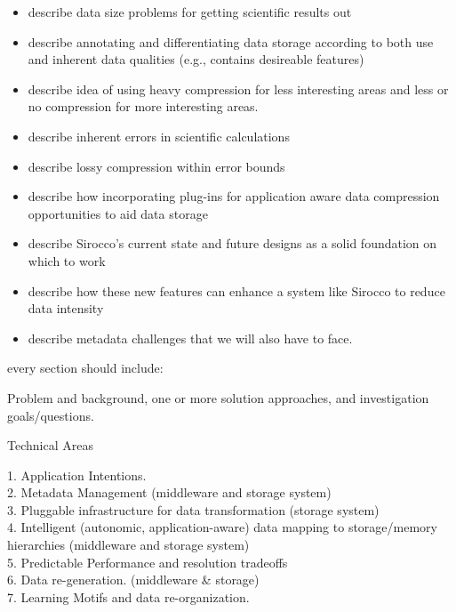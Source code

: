 {\begin{itemize}

\item describe data size problems for getting scientific results out
\item describe annotating and differentiating data storage according to both
  use and inherent data qualities (e.g., contains desireable features)
\item describe idea of using heavy compression for less interesting areas
  and less or no compression for more interesting areas.
\item describe inherent errors in scientific calculations
\item describe lossy compression within error bounds
\item describe how incorporating plug-ins for application aware data
  compression opportunities to aid data storage
\item describe Sirocco's current state and future designs as a solid
  foundation on which to work
\item describe how these new features can enhance a system like Sirocco to
  reduce data intensity
\item describe metadata challenges that we will also have to face.

\end{itemize}

every section should include:

Problem and background, one or more solution approaches, and investigation
goals/questions.

Technical Areas
 
1. Application Intentions.\\
2. Metadata Management (middleware and storage system)\\
3. Pluggable infrastructure for data transformation (storage system)\\
4. Intelligent (autonomic, application-aware) data mapping to storage/memory hierarchies (middleware and storage system)\\
5. Predictable Performance and resolution tradeoffs\\
6. Data re-generation. (middleware \& storage)\\
7. Learning Motifs and data re-organization.\\


}